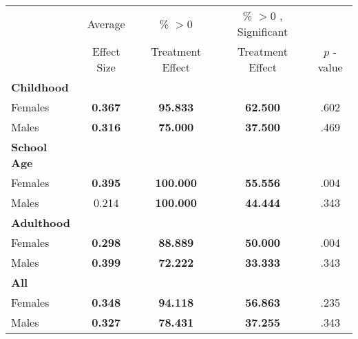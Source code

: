 \begin{tabular}{l c c c c}
\toprule
 & Average & \% $ >0 $ & \% $ >0 $ , Significant & \citet{Rosenbaum_2005_Distribution_JRSS} \\
 & Effect Size & Treatment Effect & Treatment Effect & $ p $ -value \\
\midrule
\textbf{Childhood} & & & & \\
\quad Females &  \textbf{    0.367} & \textbf{   95.833} & \textbf{   62.500} & .602 \\
\quad Males &  \textbf{    0.316} & \textbf{   75.000} & \textbf{   37.500} & .469 \\
\midrule
\textbf{School Age} & & & & \\
\quad Females &  \textbf{    0.395} & \textbf{  100.000} & \textbf{   55.556} & .004 \\
\quad Males &      0.214 & \textbf{  100.000} & \textbf{   44.444} & .343 \\
\midrule
\textbf{Adulthood} & & & & \\
\quad Females &  \textbf{    0.298} & \textbf{   88.889} & \textbf{   50.000} & .004 \\
\quad Males &  \textbf{    0.399} & \textbf{   72.222} & \textbf{   33.333} & .343 \\
\midrule
\textbf{All} & & & & \\
\quad Females &  \textbf{    0.348} & \textbf{   94.118} & \textbf{   56.863} & .235 \\
\quad Males &  \textbf{    0.327} & \textbf{   78.431} & \textbf{   37.255} & .343 \\
\bottomrule
\end{tabular}
